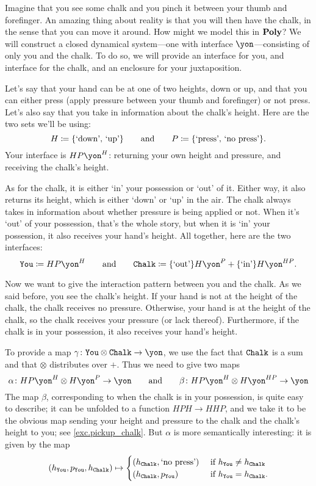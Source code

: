\documentclass[Book-Poly]{subfiles}
\begin{document}
\begin{example}\label{ex.pickup_chalk}
Imagine that you see some chalk and you pinch it between your thumb and forefinger. 
An amazing thing about reality is that you will then have the chalk, in the sense that you can move it around.
How might we model this in $\mathbf{Poly}$?
We will construct a closed dynamical system---one with interface $\yon$---consisting of only you and the chalk.
To do so, we will provide an interface for you, and interface for the chalk, and an enclosure for your juxtaposition.

Let's say that your hand can be at one of two heights, down or up, and that you can either press (apply pressure between your thumb and forefinger) or not press. Let's also say that you take in information about the chalk's height. Here are the two sets we'll be using:
\[
	H\coloneqq\{\text{`down', `up'}\}
	\qquad\text{and}\qquad
	P\coloneqq\{\text{`press', `no press'}\}.
\]
Your interface is $HP\yon^H$: returning your own height and pressure, and receiving the chalk's height.

As for the chalk, it is either `in' your possession or `out' of it.
Either way, it also returns its height, which is either `down' or `up' in the air.
The chalk always takes in information about whether pressure is being applied or not.
When it's `out' of your possession, that's the whole story, but when it is `in' your possession, it also receives your hand's height.
All together, here are the two interfaces:
\[
	\const{You}\coloneqq HP\yon^H
	\qqand
	\const{Chalk}\coloneqq \{\text{`out'}\}H\yon^P + \{\text{`in'}\}H\yon^{HP}.
\]

Now we want to give the interaction pattern between you and the chalk.
As we said before, you see the chalk's height.
If your hand is not at the height of the chalk, the chalk receives no pressure.
Otherwise, your hand is at the height of the chalk, so the chalk receives your pressure (or lack thereof).
Furthermore, if the chalk is in your possession, it also receives your hand's height. 

To provide a map $\gamma\colon\const{You}\otimes\const{Chalk}\to\yon$, we use the fact that $\texttt{Chalk}$ is a sum and that $\otimes$ distributes over $+$.
Thus we need to give two maps
\[
	\alpha\colon HP\yon^H\otimes H\yon^P\to\yon
	\qqand
	\beta\colon HP\yon^H\otimes H\yon^{HP}\to\yon
\]
The map $\beta$, corresponding to when the chalk is in your possession, is quite easy to describe; it can be unfolded to a function
$HPH\to HHP$, and we take it to be the obvious map sending your height and pressure to the chalk and the chalk's height to you; see \cref{exc.pickup_chalk}. But $\alpha$ is more semantically interesting: it is given by the map
\[
  (h_{\texttt{You}},p_{\texttt{You}},h_{\texttt{Chalk}})\mapsto
  \begin{cases}
  	(h_{\texttt{Chalk}},\text{`no press'}) & \textnormal{ if } h_{\texttt{You}} \neq h_{\texttt{Chalk}} \\
  	(h_{\texttt{Chalk}},p_{\texttt{You}}) & \textnormal{ if } h_{\texttt{You}} = h_{\texttt{Chalk}}.
  \end{cases}
\]


\end{example}
\end{document}
